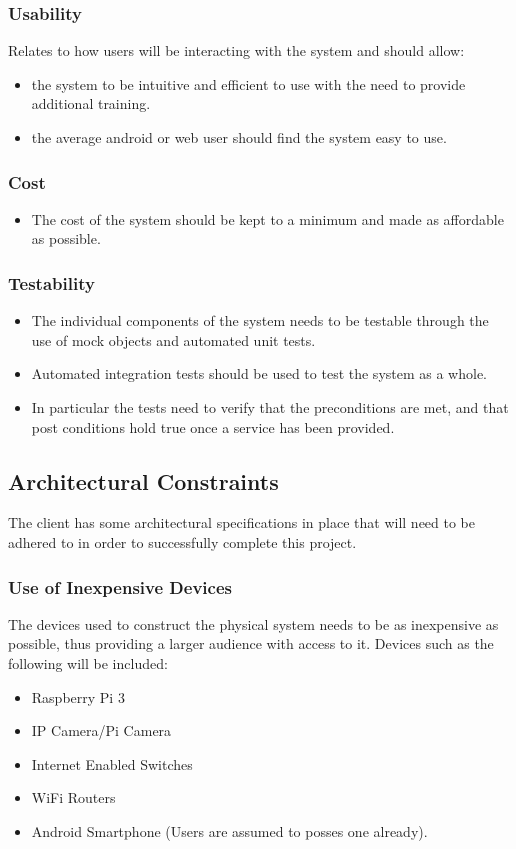 \documentclass[a4paper,12pt]{article}
\begin{document}
	\subsubsection{Usability}
	Relates to how users will be interacting with the system and should allow:
	\begin{itemize}
		\item the system to be intuitive and efficient to use with the need to provide additional training.
		\item the average android or web user should find the system easy to use.
	\end{itemize}
	
	\subsubsection{Cost}
	\begin{itemize}
		\item The cost of the system should be kept to a minimum and made as affordable as possible.  
	\end{itemize}
	
	\subsubsection{Testability}
	\begin{itemize}
		\item The individual components of the system needs to be testable through the use of mock objects and automated unit tests.
		\item Automated integration tests should be used to test the system as a whole.
		\item In particular the tests need to verify that the preconditions are met, and that post conditions hold true once a service has been provided.
	\end{itemize}
	
	\newpage
	\subsection{Architectural Constraints}
	The client has some architectural specifications in place that will need to be adhered to in order to successfully complete this project.
	
	\subsubsection{Use of Inexpensive Devices}
	The devices used to construct the physical system needs to be as inexpensive as possible, thus providing a larger audience with access to it. Devices such as the following will be included:
	\begin{itemize}
		\item Raspberry Pi 3
		\item IP Camera/Pi Camera
		\item Internet Enabled Switches
		\item WiFi Routers
		\item Android Smartphone (Users are assumed to posses one already).
	\end{itemize}
	
\end{document}
